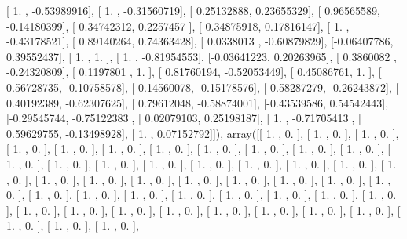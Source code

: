 \documentclass{article}
\begin{document}
       [ 1.        , -0.53989916],
       [ 1.        , -0.31560719],
       [ 0.25132888,  0.23655329],
       [ 0.96565589, -0.14180399],
       [ 0.34742312,  0.2257457 ],
       [ 0.34875918,  0.17816147],
       [ 1.        , -0.43178521],
       [ 0.89140264,  0.74363428],
       [ 0.0338013 , -0.60879829],
       [-0.06407786,  0.39552437],
       [ 1.        ,  1.        ],
       [ 1.        , -0.81954553],
       [-0.03641223,  0.20263965],
       [ 0.3860082 , -0.24320809],
       [ 0.1197801 ,  1.        ],
       [ 0.81760194, -0.52053449],
       [ 0.45086761,  1.        ],
       [ 0.56728735, -0.10758578],
       [ 0.14560078, -0.15178576],
       [ 0.58287279, -0.26243872],
       [ 0.40192389, -0.62307625],
       [ 0.79612048, -0.58874001],
       [-0.43539586,  0.54542443],
       [-0.29545744, -0.75122383],
       [ 0.02079103,  0.25198187],
       [ 1.        , -0.71705413],
       [ 0.59629755, -0.13498928],
       [ 1.        ,  0.07152792]]), array([[ 1.        ,  0.        ],
       [ 1.        ,  0.        ],
       [ 1.        ,  0.        ],
       [ 1.        ,  0.        ],
       [ 1.        ,  0.        ],
       [ 1.        ,  0.        ],
       [ 1.        ,  0.        ],
       [ 1.        ,  0.        ],
       [ 1.        ,  0.        ],
       [ 1.        ,  0.        ],
       [ 1.        ,  0.        ],
       [ 1.        ,  0.        ],
       [ 1.        ,  0.        ],
       [ 1.        ,  0.        ],
       [ 1.        ,  0.        ],
       [ 1.        ,  0.        ],
       [ 1.        ,  0.        ],
       [ 1.        ,  0.        ],
       [ 1.        ,  0.        ],
       [ 1.        ,  0.        ],
       [ 1.        ,  0.        ],
       [ 1.        ,  0.        ],
       [ 1.        ,  0.        ],
       [ 1.        ,  0.        ],
       [ 1.        ,  0.        ],
       [ 1.        ,  0.        ],
       [ 1.        ,  0.        ],
       [ 1.        ,  0.        ],
       [ 1.        ,  0.        ],
       [ 1.        ,  0.        ],
       [ 1.        ,  0.        ],
       [ 1.        ,  0.        ],
       [ 1.        ,  0.        ],
       [ 1.        ,  0.        ],
       [ 1.        ,  0.        ],
       [ 1.        ,  0.        ],
       [ 1.        ,  0.        ],
       [ 1.        ,  0.        ],
       [ 1.        ,  0.        ],
       [ 1.        ,  0.        ],
       [ 1.        ,  0.        ],
       [ 1.        ,  0.        ],
       [ 1.        ,  0.        ],
       [ 1.        ,  0.        ],
       [ 1.        ,  0.        ],
       [ 1.        ,  0.        ],
       [ 1.        ,  0.        ],
\end{document}
